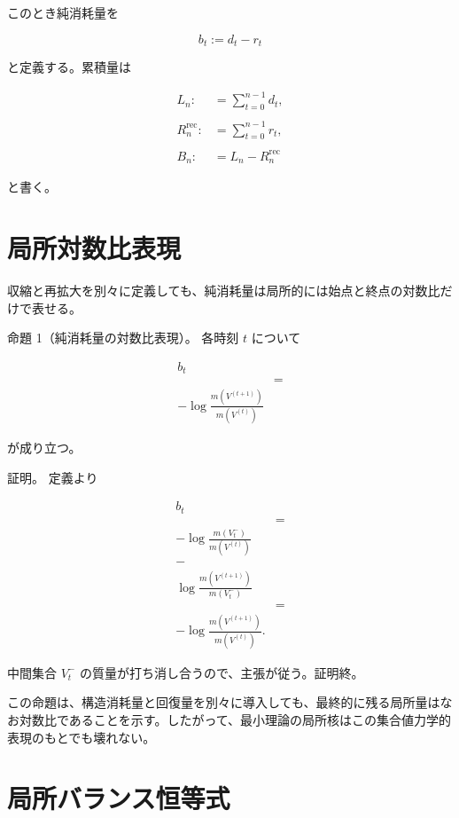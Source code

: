 \documentclass[12pt,a4paper]{article}
\begin{document}
このとき純消耗量を

\[
b_{t} := d_{t} - r_{t}
\]

と定義する。累積量は

\[
\begin{aligned}
L_{n} :&= \sum_{t=0}^{n-1} d_{t}, \\
\qquad \\
R_{n}^{\mathrm{rec}} :&= \sum_{t=0}^{n-1} r_{t}, \\
\qquad \\
B_{n} :&= L_{n} - R_{n}^{\mathrm{rec}}
\end{aligned}
\]

と書く。

\section{局所対数比表現}\label{ux5c40ux6240ux5bfeux6570ux6bd4ux8868ux73fe}

収縮と再拡大を別々に定義しても、純消耗量は局所的には始点と終点の対数比だけで表せる。

命題 1（純消耗量の対数比表現）。 各時刻 \(t\) について

\[
\begin{aligned}
b_{t} \\
&= \\
- \log \frac{m(V^{(t+1)})}{m(V^{(t)})}
\end{aligned}
\]

が成り立つ。

証明。 定義より

\[
\begin{aligned}
b_{t} \\
&= \\
-\log \frac{m(V_{t}^-)}{m(V^{(t)})} \\
- \\
\log \frac{m(V^{(t+1)})}{m(V_{t}^-)} \\
&= \\
-\log \frac{m(V^{(t+1)})}{m(V^{(t)})}.
\end{aligned}
\]

中間集合 \(V_{t}^-\) の質量が打ち消し合うので、主張が従う。証明終。

この命題は、構造消耗量と回復量を別々に導入しても、最終的に残る局所量はなお対数比であることを示す。したがって、最小理論の局所核はこの集合値力学的表現のもとでも壊れない。

\section{局所バランス恒等式}\label{ux5c40ux6240ux30d0ux30e9ux30f3ux30b9ux6052ux7b49ux5f0f}
\end{document}
